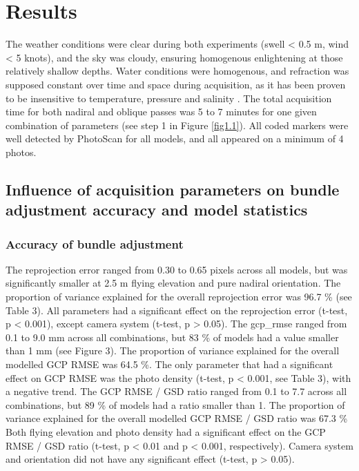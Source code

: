\section{Results}\label{chapitre1_3}
The weather conditions were clear during both experiments (swell < 0.5 m, wind < 5 knots), and the sky was cloudy, ensuring homogenous enlightening at those relatively shallow depths. Water conditions were homogenous, and refraction was supposed constant over time and space during acquisition, as it has been proven to be insensitive to temperature, pressure and salinity \citep{moore_underwater_1976}. The total acquisition time for both nadiral and oblique passes was 5 to 7 minutes for one given combination of parameters (see step 1 in Figure \ref{fig1.1}). All coded markers were well detected by PhotoScan for all models, and all appeared on a minimum of 4 photos.

\subsection{Influence of acquisition parameters on bundle adjustment accuracy and model statistics}\label{chapitre1_3.1}

\subsubsection{Accuracy of bundle adjustment}\label{chapitre1_3.1.1}
The reprojection error ranged from 0.30 to 0.65 pixels across all models, but was significantly smaller at 2.5 m flying elevation and pure nadiral orientation. The proportion of variance explained for the overall reprojection error was 96.7 \% (see Table 3). All parameters had a significant effect on the reprojection error (t-test, p < 0.001), except camera system (t-test, p > 0.05). 
\medskip
The \acrshort{gcp_rmse} ranged from 0.1 to 9.0 mm across all combinations, but 83 \% of models had a value smaller than 1 mm (see Figure 3). The proportion of variance explained for the overall modelled GCP RMSE was 64.5 \%. The only parameter that had a significant effect on GCP RMSE was the photo density (t-test, p < 0.001, see Table 3), with a negative trend. 
\medskip
The GCP RMSE / GSD ratio ranged from 0.1 to 7.7 across all combinations, but 89 \% of models had a ratio smaller than 1. The proportion of variance explained for the overall modelled GCP RMSE / GSD ratio was 67.3 \% Both flying elevation and photo density had a significant effect on the GCP RMSE / GSD ratio (t-test, p < 0.01 and p < 0.001, respectively). Camera system and orientation did not have any significant effect (t-test, p > 0.05).
